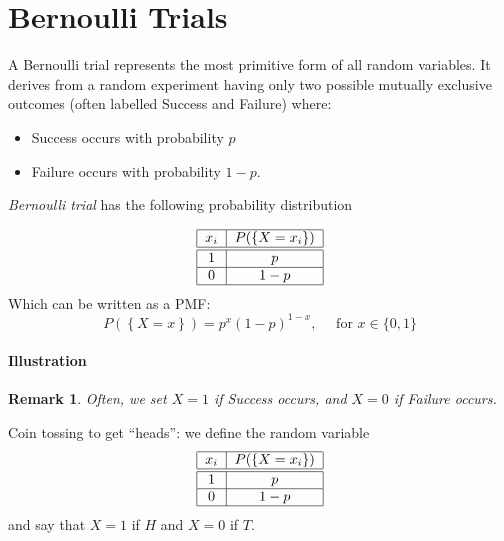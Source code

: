 \documentclass[smaller]{beamer}\usepackage[]{graphicx}\usepackage[]{color}
\newtheorem{remark}{Remark}[section]
\begin{document}
\section{Bernoulli Trials}

\begin{frame}{\secname}
  A Bernoulli trial represents the most primitive form of all random variables. It derives from a random experiment having only two possible mutually exclusive outcomes (often labelled Success and Failure) where:

  \begin{itemize}
  \item Success occurs with probability $p$

  \item Failure occurs with probability $1-p$.
  \end{itemize}

  \pause

  \begin{definition}
  \textit{Bernoulli trial} has the following probability distribution

  \begin{equation*}
  \begin{tabular}{|c|c|}
  \hline
  $x_i$ & $P(\left\{ X=x_i\right\}) $ \\ \hline\hline
  $1$ & $p$ \\ \hline
  $0$ & $1-p$ \\ \hline
  \end{tabular}%
  \end{equation*}
  Which can be written as a PMF:
  \begin{equation*}
  P(\left\{ X=x\right\} ) =p^{x}\left( 1-p\right) ^{1-x}, \quad \text{ for }x\in \{0,1\}
  \end{equation*}
  \end{definition}
\end{frame}


\begin{frame}{\secname}
\framesubtitle{Illustration}
  \begin{remark}
  Often, we set $X=1$ if \emph{Success} occurs, and $X=0$ if \emph{Failure} occurs.
  \end{remark}


  \begin{example}
  \begin{footnotesize}
  Coin tossing to get ``heads'': we define the random variable
  \begin{equation*}
  \begin{tabular}{|c | c|}
  \hline
  $x_i$ & $P(\left\{ X=x_i\right\}) $ \\ \hline\hline
  $1$ & $p$ \\ \hline
  $0$ & $1-p$ \\ \hline
  \end{tabular}%
  \end{equation*}
  and say that $X=1$ if $H$ and $X=0$ if $T$.
  \end{footnotesize}
  \end{example}
\end{frame}
\end{document}
